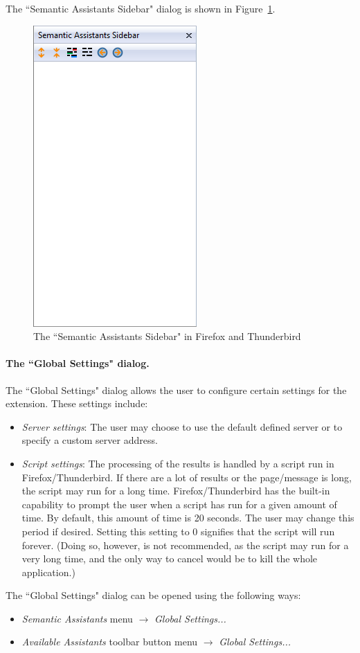 The ``Semantic Assistants Sidebar" dialog is shown in Figure~\ref{fig:mozilla_features_sidebar}. 

\begin{figure}[htb]
  \centering
  \includegraphics[totalheight=0.5\textheight]{pictures/mozilla_features_sidebar.png}
  \caption{The ``Semantic Assistants Sidebar" in Firefox and Thunderbird}
  \label{fig:mozilla_features_sidebar}
\end{figure}

\paragraph{The ``Global Settings" dialog.} The ``Global Settings" dialog allows the user to configure certain settings for the extension. These settings include:
\begin{itemize} 
  \item \emph{Server settings}: The user may choose to use the default defined server or to specify a custom server address. 
  \item \emph{Script settings}: The processing of the results is handled by a script run in Firefox/Thunderbird. If there are a lot of results or the page/message is long, the script may run for a long time. Firefox/Thunderbird has the built-in capability to prompt the user when a script has run for a given amount of time. By default, this amount of time is 20 seconds. The user may change this period if desired. Setting this setting to 0 signifies that the script will run forever. (Doing so, however, is not recommended, as the script may run for a very long time, and the only way to cancel would be to kill the whole application.)
\end{itemize} 
The ``Global Settings" dialog can be opened using the following ways: 
\begin{itemize} 
  \item \emph{Semantic Assistants} menu $\rightarrow$ \emph{Global Settings...}
  \item \emph{Available Assistants} toolbar button menu $\rightarrow$ \emph{Global Settings...}
\end{itemize} 

